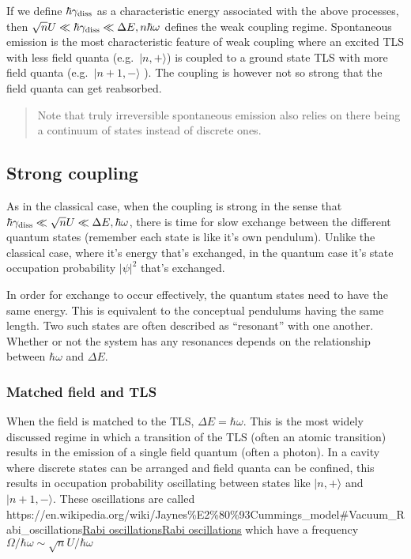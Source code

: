 \documentclass[
]{article}
\let\oldhref\href
\renewcommand{\href}[2]{\ifx#1\urlprefix\oldhref{#1}{#2}\else\uline{\oldhref{#1}{#2}}\fi}
\renewcommand{\[}{\begin{equation}}
\renewcommand{\]}{\end{equation}}
\begin{document}
If we define \(\hbar\gamma_{\rm diss}\) as a characteristic energy
associated with the above processes, then
\(\sqrt{n}U \ll \hbar \gamma_{\rm diss} \ll \Delta E , n\hbar \omega\)
defines the weak coupling regime. Spontaneous emission is the most
characteristic feature of weak coupling where an excited TLS with less
field quanta (e.g.~\(|n,+\rangle\)) is coupled to a ground state TLS
with more field quanta (e.g.~\(|n+1,-\rangle\) ). The coupling is
however not so strong that the field quanta can get reabsorbed.

\begin{quote}
Note that truly irreversible spontaneous emission also relies on there
being a continuum of states instead of discrete ones.
\end{quote}

\subsection{Strong coupling}\label{strong-coupling-1}

As in the classical case, when the coupling is strong in the sense that
\(\hbar\gamma_{\rm diss} \ll \sqrt{n}U \ll \Delta E , \hbar \omega\),
there is time for slow exchange between the different quantum states
(remember each state is like it's own pendulum). Unlike the classical
case, where it's energy that's exchanged, in the quantum case it's state
occupation probability \(|\psi|^2\) that's exchanged.

In order for exchange to occur effectively, the quantum states need to
have the same energy. This is equivalent to the conceptual pendulums
having the same length. Two such states are often described as
``resonant'' with one another. Whether or not the system has any
resonances depends on the relationship between \(\hbar \omega\) and
\(\Delta E\).

\subsubsection{Matched field and TLS}\label{matched-field-and-tls}

When the field is matched to the TLS, \(\Delta E = \hbar\omega\). This
is the most widely discussed regime in which a transition of the TLS
(often an atomic transition) results in the emission of a single field
quantum (often a photon). In a cavity where discrete states can be
arranged and field quanta can be confined, this results in occupation
probability oscillating between states like \(|n,+\rangle\) and
\(|n+1,-\rangle\). These oscillations are called
\href{https://en.wikipedia.org/wiki/Jaynes\%E2\%80\%93Cummings_model\#Vacuum_Rabi_oscillations}{Rabi
oscillations} which have a frequency
\(\Omega/\hbar\omega \sim \sqrt{n}U/\hbar\omega\)
\end{document}
